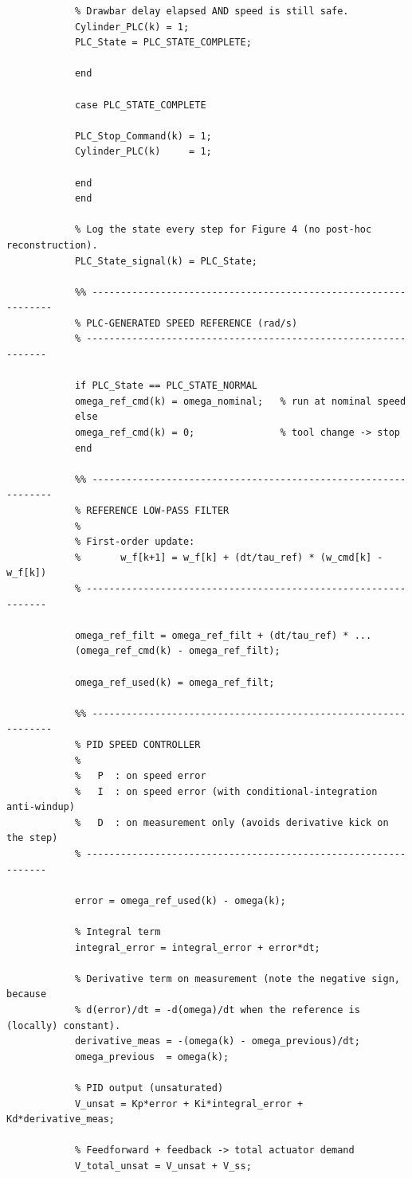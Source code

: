 \documentclass[12pt,a4paper]{report}
\begin{document}
\begin{lstlisting}
			% Drawbar delay elapsed AND speed is still safe.
			Cylinder_PLC(k) = 1;
			PLC_State = PLC_STATE_COMPLETE;
			
			end
			
			case PLC_STATE_COMPLETE
			
			PLC_Stop_Command(k) = 1;
			Cylinder_PLC(k)     = 1;
			
			end
			end
			
			% Log the state every step for Figure 4 (no post-hoc reconstruction).
			PLC_State_signal(k) = PLC_State;
			
			%% ---------------------------------------------------------------
			% PLC-GENERATED SPEED REFERENCE (rad/s)
			% ---------------------------------------------------------------
			
			if PLC_State == PLC_STATE_NORMAL
			omega_ref_cmd(k) = omega_nominal;   % run at nominal speed
			else
			omega_ref_cmd(k) = 0;               % tool change -> stop
			end
			
			%% ---------------------------------------------------------------
			% REFERENCE LOW-PASS FILTER
			%
			% First-order update:
			%       w_f[k+1] = w_f[k] + (dt/tau_ref) * (w_cmd[k] - w_f[k])
			% ---------------------------------------------------------------
			
			omega_ref_filt = omega_ref_filt + (dt/tau_ref) * ...
			(omega_ref_cmd(k) - omega_ref_filt);
			
			omega_ref_used(k) = omega_ref_filt;
			
			%% ---------------------------------------------------------------
			% PID SPEED CONTROLLER
			%
			%   P  : on speed error
			%   I  : on speed error (with conditional-integration anti-windup)
			%   D  : on measurement only (avoids derivative kick on the step)
			% ---------------------------------------------------------------
			
			error = omega_ref_used(k) - omega(k);
			
			% Integral term
			integral_error = integral_error + error*dt;
			
			% Derivative term on measurement (note the negative sign, because
			% d(error)/dt = -d(omega)/dt when the reference is (locally) constant).
			derivative_meas = -(omega(k) - omega_previous)/dt;
			omega_previous  = omega(k);
			
			% PID output (unsaturated)
			V_unsat = Kp*error + Ki*integral_error + Kd*derivative_meas;
			
			% Feedforward + feedback -> total actuator demand
			V_total_unsat = V_unsat + V_ss;
			

\end{lstlisting}
\end{document}
